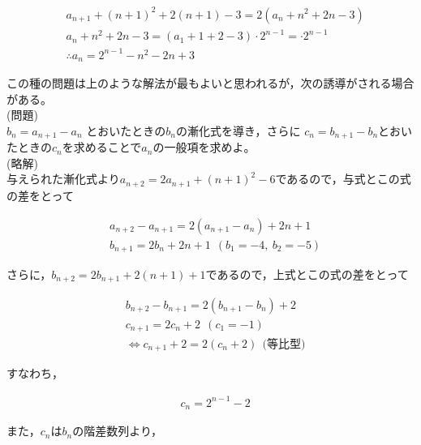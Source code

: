 \documentclass[autodetect-engine,ja=standard, 10.5pt, a4paper, titlepage]{bxjsarticle}
\begin{document}
\begin{enumerate}[1.]
\begin{fleqn}[20pt]
            \begin{align*}
              &a_{n+1} + (n+1)^2 + 2(n+1) - 3
                      = 2( a_n + n^2 + 2n - 3 ) \\
              & a_n + n^2 + 2n - 3 = (a_1 + 1 + 2 - 3 )\cdot 2^{n-1} = \cdot 2^{n-1} \\
              & \therefore a_n = 2^{n-1} - n^2 - 2n + 3
            \end{align*}
          \end{fleqn}
\baselineskip
この種の問題は上のような解法が最もよいと思われるが，次の誘導がされる場合がある。\\
        \noindent(問題)\\
        $b_n = a_{n+1} - a_n$ とおいたときの$b_n$の漸化式を導き，さらに
        $c_n = b_{n+1} - b_n$とおいたときの$c_n$を求めることで$a_n$の一般項を求めよ。 \\
        \noindent(略解)\\
        与えられた漸化式より$a_{n+2} = 2a_{n+1} + (n+1)^2 - 6$であるので，与式とこの式の差をとって
          \begin{fleqn}[20pt]
            \begin{align*}
              &a_{n+2} - a_{n+1} = 2(a_{n+1} - a_n) + 2n +1 \\
              & b_{n+1} = 2b_n + 2n + 1 \:\: (b_1 = -4,\: b_2 = -5)
            \end{align*}
          \end{fleqn}
        さらに，$b_{n+2} = 2b_{n+1} + 2(n+1) + 1$であるので，上式とこの式の差をとって
          \begin{fleqn}[20pt]
            \begin{align*}
              &b_{n+2} - b_{n+1} = 2(b_{n+1} - b_n) + 2 \\
              &c_{n+1} = 2c_n + 2 \:\: (c_1 = -1) \\
              & \Leftrightarrow c_{n+1} + 2 = 2(c_n + 2) \:\: \text{(等比型)}
            \end{align*}
          \end{fleqn}
        すなわち，
          \begin{fleqn}[20pt]
            \begin{align*}
              &c_n = 2^{n-1} - 2
            \end{align*}
          \end{fleqn}
        また，$c_n$は$b_n$の階差数列より，
          \begin{fleqn}[20pt]

\end{fleqn}
\end{enumerate}
\end{document}
